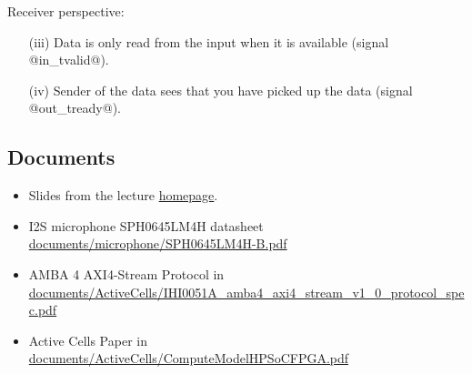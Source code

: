 \documentclass[10pt, a4]{article}
\begin{document}
Receiver perspective:
\begin{enumerate}
\item[(iii)] Data is only read from the input when it is available (signal @in_tvalid@).  
\item[(iv)] Sender of the data sees that you have picked up the data (signal @out_tready@).
\end{enumerate}

\subsection*{Documents}
\begin{itemize}
\item Slides from the lecture \href{http://lec.inf.ethz.ch/syscon}{homepage}.
\item I2S microphone SPH0645LM4H datasheet \href{https://svn.inf.ethz.ch/svn/lecturers/vorlesungen/trunk/syscon/2019/shared/documents/microphone/SPH0645LM4H-B.pdf}{documents/microphone/SPH0645LM4H-B.pdf}
\item AMBA 4 AXI4-Stream Protocol in \href{https://svn.inf.ethz.ch/svn/lecturers/vorlesungen/trunk/syscon/2018/shared/documents/ActiveCells/IHI0051A_amba4_axi4_stream_v1_0_protocol_spec.pdf}{documents/ActiveCells/IHI0051A\_amba4\_axi4\_stream\_v1\_0\_protocol\_spec.pdf}
\item Active Cells Paper in \href{https://svn.inf.ethz.ch/svn/lecturers/vorlesungen/trunk/syscon/2018/shared/documents/ActiveCells/ComputeModelHPSoCFPGA.pdf}{documents/ActiveCells/ComputeModelHPSoCFPGA.pdf}
\end{itemize}
\end{document}
